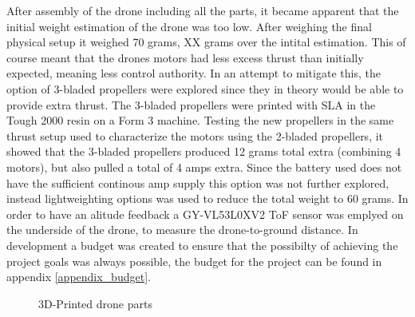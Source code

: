 After assembly of the drone including all the parts, it became apparent that the initial weight estimation of the drone was too low. After weighing the final physical setup it weighed 70 grams, XX grams over the intital estimation. This of course meant that the drones motors had less excess thrust than initially expected, meaning less control authority. In an attempt to mitigate this, the option of 3-bladed propellers were explored since they in theory would be able to provide extra thrust. The 3-bladed propellers were printed with SLA in the Tough 2000 resin on a Form 3 machine. Testing the new propellers in the same thrust setup used to characterize the motors using the 2-bladed propellers, it showed that the 3-bladed propellers produced 12 grams total extra (combining 4 motors), but also pulled a total of 4 amps extra. Since the battery used does not have the sufficient continous amp supply this option was not further explored, instead lightweighting options was used to reduce the total weight to 60 grams. In order to have an alitude feedback a GY-VL53L0XV2 ToF sensor was emplyed on the underside of the drone, to measure the drone-to-ground distance. In development a budget was created to ensure that the possibilty of achieving the project goals was always possible, the budget for the project can be found in appendix \ref{appendix_budget}.


\begin{figure}[H]%
    \centering
    \qquad
    \qquad
    \caption{3D-Printed drone parts}%
    \label{fig:example}%
\end{figure}